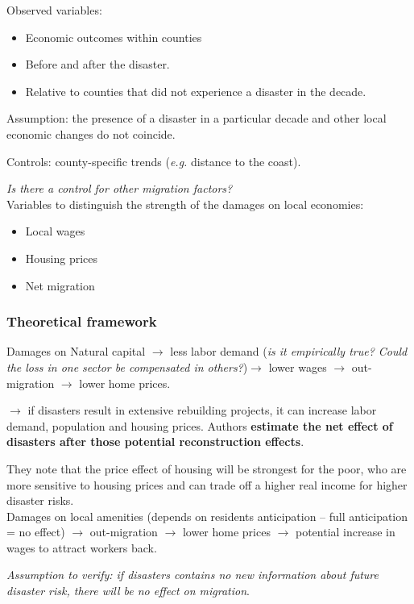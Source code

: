\documentclass[11pt, oneside]{article}   	%
\begin{document}
Observed variables: 
\begin{itemize}
    \item Economic outcomes within counties
    \item Before and after the disaster.
    \item Relative to counties that did not experience a disaster in the decade.
\end{itemize}

Assumption: the presence of a disaster in a particular decade and other local economic changes do not coincide.

Controls: county-specific trends (\textit{e.g.} distance to the coast). 

\textit{Is there a control for other migration factors?} \\

Variables to distinguish the strength of the damages on local economies: 
\begin{itemize}
    \item Local wages
    \item Housing prices
    \item Net migration
\end{itemize}

\subsubsection{Theoretical framework}
{Damages on Natural capital} $\to$ {less labor demand} (\textit{is it empirically true? Could the loss in one sector be compensated in others?})$\to$ {lower wages} $\to$ {out-migration} $\to$ lower home prices.

$\to$ if disasters result in extensive rebuilding projects, it can increase labor demand, population and housing prices. Authors \textbf{estimate the net effect of disasters after those potential reconstruction effects}.

They note that the price effect of housing will be strongest for the poor, who are more sensitive to housing prices and can trade off a higher real income for higher disaster risks. \\

{Damages on local amenities} (depends on residents anticipation -- full anticipation = no effect) $\to$ {out-migration} $\to$ lower home prices $\to$ {potential increase in wages to attract workers back}. 

\textit{Assumption to verify: if disasters contains no new information about future disaster risk, there will be no effect on migration}. \\
\end{document}
